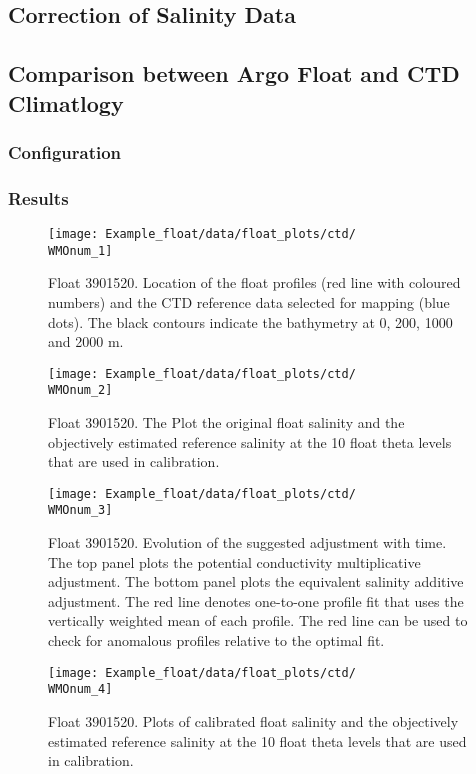 \documentclass{article}
\newcommand{\WMOnum}{3901520} %
\begin{document}
\begin{flushleft}
\newpage
\section{Correction of Salinity Data}
\subsection{Comparison between Argo Float and CTD Climatlogy}
\subsubsection{Configuration}
\label{Configuration1}
 
\subsubsection{Results} \label{results_CTD}
\begin{figure}[H]
    \centering    
    \texttt{[image: Example\_float/data/float\_plots/ctd/\\WMOnum\_1]}
    \caption{Float \WMOnum. Location of the float profiles (red line with coloured numbers) and the CTD reference data selected for mapping (blue dots). The black contours indicate the bathymetry at 0, 200, 1000 and 2000 m.}
    \label{trajectoryCTD}
\end{figure}

\newpage
\begin{figure}[H]
    \centering    
    \texttt{[image: Example\_float/data/float\_plots/ctd/\\WMOnum\_2]}
    \caption{Float \WMOnum. The Plot the original float salinity and the objectively estimated reference salinity at the 10 float theta levels that are used in calibration.}
    \label{uncalibVsSalinity}
\end{figure}

\begin{figure}[H]
    \centering    
    \texttt{[image: Example\_float/data/float\_plots/ctd/\\WMOnum\_3]}
    \caption{Float \WMOnum. Evolution of the suggested adjustment with time. The top panel plots the potential conductivity multiplicative adjustment. The bottom panel plots the equivalent salinity additive adjustment. The red line denotes one-to-one profile fit that uses the vertically weighted mean of each profile. The red line can be used to check for anomalous profiles relative to the optimal fit.}
    \label{SalWithErrors}
\end{figure}

\begin{figure}[H]
    \centering    
    \texttt{[image: Example\_float/data/float\_plots/ctd/\\WMOnum\_4]}
    \caption{Float \WMOnum. Plots of calibrated float salinity and the objectively estimated reference salinity at the 10 float theta levels that are used in calibration.}
    \label{CalibVsSalinity}
\end{figure}


\end{flushleft}
\end{document}
